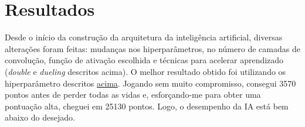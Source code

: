 \chapter{Resultados}
\label{cap:resultados}

Desde o início da construção da arquitetura da inteligência artificial, diversas alterações foram feitas: mudanças nos hiperparâmetros, no número de camadas de convolução, função de ativação escolhida e técnicas para acelerar aprendizado (\textit{double} e \textit{dueling} descritos acima).
O melhor resultado obtido foi utilizando os hiperparâmetro descritos \hyperref[table:2]{acima}.
Jogando sem muito compromisso, consegui 3570 pontos antes de perder todas as vidas e, esforçando-me para obter uma pontuação alta, cheguei em 25130 pontos.
Logo, o desempenho da IA está bem abaixo do desejado.

